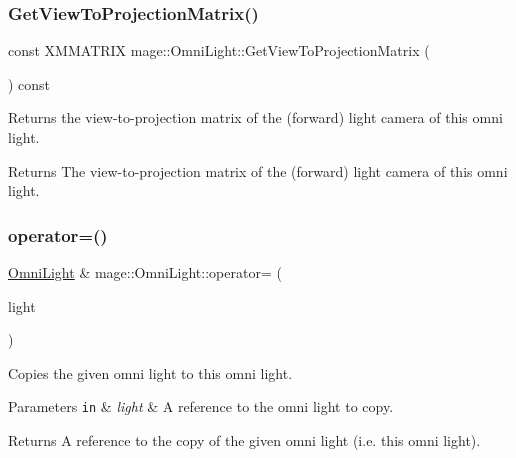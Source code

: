 \subsubsection{\texorpdfstring{Get\+View\+To\+Projection\+Matrix()}{GetViewToProjectionMatrix()}}
{\footnotesize\ttfamily const X\+M\+M\+A\+T\+R\+IX mage\+::\+Omni\+Light\+::\+Get\+View\+To\+Projection\+Matrix (\begin{DoxyParamCaption}{ }\end{DoxyParamCaption}) const\hspace{0.3cm}{\ttfamily [noexcept]}}

Returns the view-\/to-\/projection matrix of the (forward) light camera of this omni light.

\begin{DoxyReturn}{Returns}
The view-\/to-\/projection matrix of the (forward) light camera of this omni light. 
\end{DoxyReturn}
\hypertarget{classmage_1_1_omni_light_a7bdce151d327daef5e1f31daedcc4627}{}\label{classmage_1_1_omni_light_a7bdce151d327daef5e1f31daedcc4627} 
\subsubsection{\texorpdfstring{operator=()}{operator=()}\hspace{0.1cm}{\footnotesize\ttfamily [1/2]}}
{\footnotesize\ttfamily \hyperlink{classmage_1_1_omni_light}{Omni\+Light} \& mage\+::\+Omni\+Light\+::operator= (\begin{DoxyParamCaption}\item[{const \hyperlink{classmage_1_1_omni_light}{Omni\+Light} \&}]{light }\end{DoxyParamCaption})\hspace{0.3cm}{\ttfamily [default]}}

Copies the given omni light to this omni light.


\begin{DoxyParams}[1]{Parameters}
\mbox{\tt in}  & {\em light} & A reference to the omni light to copy. \\
\hline
\end{DoxyParams}
\begin{DoxyReturn}{Returns}
A reference to the copy of the given omni light (i.\+e. this omni light). 
\end{DoxyReturn}
\hypertarget{classmage_1_1_omni_light_a287a54dede61e65efe4493ec20531428}{}\label{classmage_1_1_omni_light_a287a54dede61e65efe4493ec20531428} 
